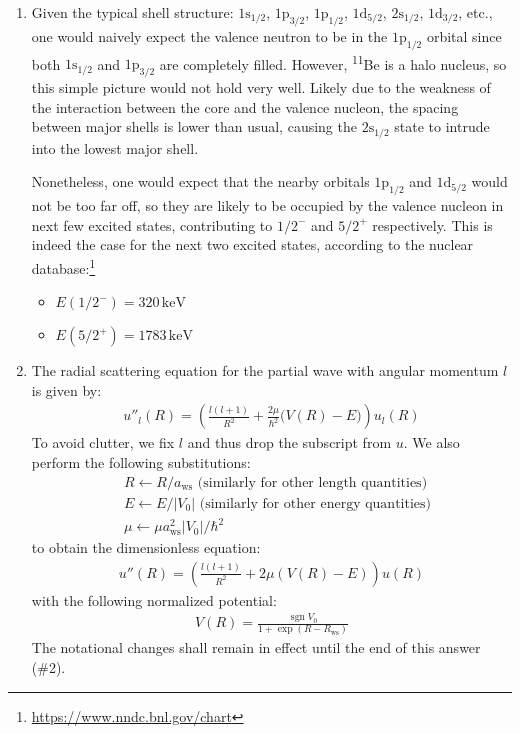 \documentclass[fleqn, 12pt]{article}
\begin{document}
\begin{enumerate}

\item Given the typical shell structure: $1\mathrm s_{1/2}$,
  $1\mathrm p_{3/2}$, $1\mathrm p_{1/2}$, $1\mathrm d_{5/2}$,
  $2\mathrm s_{1/2}$, $1\mathrm d_{3/2}$, etc., one would naively expect the
  valence neutron to be in the $1\mathrm p_{1/2}$ orbital since both
  $1\mathrm s_{1/2}$ and $1\mathrm p_{3/2}$ are completely filled.  However,
  \textsuperscript{11}Be is a halo nucleus, so this simple picture would not
  hold very well.  Likely due to the weakness of the interaction between the
  core and the valence nucleon, the spacing between major shells is lower than
  usual, causing the $2\mathrm s_{1/2}$ state to intrude into the lowest major
  shell.

  Nonetheless, one would expect that the nearby orbitals $1\mathrm p_{1/2}$
  and $1\mathrm d_{5/2}$ would not be too far off, so they are likely to be
  occupied by the valence nucleon in next few excited states, contributing to
  $1/2^-$ and $5/2^+$ respectively.  This is indeed the case for the next two
  excited states, according to the nuclear
  database:\footnote{\url{https://www.nndc.bnl.gov/chart}}
  \begin{itemize}
  \item $E(1/2^-) = 320\,\mathrm{keV}$
  \item $E(5/2^+) = 1783\,\mathrm{keV}$
  \end{itemize}

\item The radial scattering equation for the partial wave with angular
  momentum $l$ is given by:
  \begin{align*}
    u''_l(R) = \left(\frac{l (l + 1)}{R^2} +
    \frac{2 \mu}{\hbar^2} \bigl(V(R) - E\bigr)\right) u_l(R)
  \end{align*}
  To avoid clutter, we fix $l$ and thus drop the subscript from $u$.  We also
  perform the following substitutions:
  \begin{align*}
    &R \leftarrow R / a_{\text{ws}}
      \text{ (similarly for other length quantities)} \\
    &E \leftarrow E / |V_0|
      \text{ (similarly for other energy quantities)} \\
    &\mu \leftarrow \mu a_{\text{ws}}^2 |V_0| / \hbar^2
  \end{align*}
  to obtain the dimensionless equation:
  \begin{align*}
    u''(R) = \left(\frac{l (l + 1)}{R^2} +
    2 \mu \left(V(R) - E\right)\right)
    u(R)
  \end{align*}
  with the following normalized potential:
  \begin{align*}
    V(R) = \frac{\operatorname{sgn} V_0}{
    1 + \exp(R - R_{\text{ws}})}
  \end{align*}
  The notational changes shall remain in effect until the end of this answer
  (\#2).


\end{enumerate}
\end{document}

